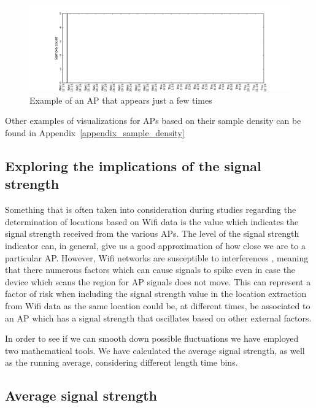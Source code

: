 \begin{figure}[h]
\centering
\includegraphics[width =\textwidth]{figures/combinations/1553_modif.png}
\caption{Example of an AP that appears just a few times}
\label{few_samples_6_2nd_day}
\end{figure}

Other examples of visualizations for APs based on their sample density can be
found in Appendix~\ref{appendix_sample_density}%

\subsection{Exploring the implications of the signal strength}
Something that is often taken into consideration during studies regarding the
determination of locations based on Wifi data is the value which indicates
the signal strength received from the various APs. The level of the signal
strength indicator can, in general, give us a good approximation of how close we
are to a particular AP. However, Wifi networks are susceptible to interferences
\cite{MahantiCWA10}, meaning that there numerous factors which can cause signals
to spike even in case the device which scans the region for AP signals does not
move. This can represent a factor of risk when including the signal strength
value in the location extraction from Wifi data as the same location could be,
at different times, be associated to an AP which has a signal strength that
oscillates based on other external factors.

In order to see if we can smooth down possible fluctuations we have employed two
mathematical tools. We have calculated the average signal strength, as well as
the running average, considering different length time bins.

\subsection{Average signal strength}
\label{average_sig}

